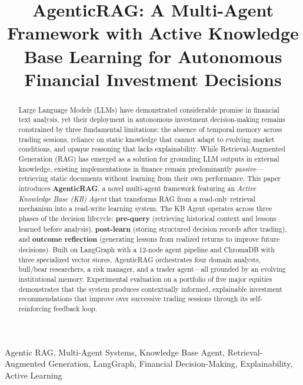 \documentclass[conference]{IEEEtran}
\begin{document}
\title{AgenticRAG: A Multi-Agent Framework with Active Knowledge Base Learning for Autonomous Financial Investment Decisions}

\author{
}

\maketitle

\begin{abstract}
Large Language Models (LLMs) have demonstrated considerable promise in financial text analysis, yet their deployment in autonomous investment decision-making remains constrained by three fundamental limitations: the absence of temporal memory across trading sessions, reliance on static knowledge that cannot adapt to evolving market conditions, and opaque reasoning that lacks explainability. While Retrieval-Augmented Generation (RAG) has emerged as a solution for grounding LLM outputs in external knowledge, existing implementations in finance remain predominantly \textit{passive}---retrieving static documents without learning from their own performance. This paper introduces \textbf{AgenticRAG}, a novel multi-agent framework featuring an \textit{Active Knowledge Base (KB) Agent} that transforms RAG from a read-only retrieval mechanism into a read-write learning system. The KB Agent operates across three phases of the decision lifecycle: \textbf{pre-query} (retrieving historical context and lessons learned before analysis), \textbf{post-learn} (storing structured decision records after trading), and \textbf{outcome reflection} (generating lessons from realized returns to improve future decisions). Built on LangGraph with a 12-node agent pipeline and ChromaDB with three specialized vector stores, AgenticRAG orchestrates four domain analysts, bull/bear researchers, a risk manager, and a trader agent---all grounded by an evolving institutional memory. Experimental evaluation on a portfolio of five major equities demonstrates that the system produces contextually informed, explainable investment recommendations that improve over successive trading sessions through its self-reinforcing feedback loop.
\end{abstract}

\begin{IEEEkeywords}
Agentic RAG, Multi-Agent Systems, Knowledge Base Agent, Retrieval-Augmented Generation, LangGraph, Financial Decision-Making, Explainability, Active Learning
\end{IEEEkeywords}
\end{document}
